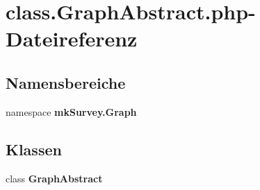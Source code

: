 \section{class.GraphAbstract.php-Dateireferenz}
\label{class_8GraphAbstract_8php}
\subsection*{Namensbereiche}
\begin{CompactItemize}
\item 
namespace {\bf mkSurvey.Graph}
\end{CompactItemize}
\subsection*{Klassen}
\begin{CompactItemize}
\item 
class {\bf GraphAbstract}
\end{CompactItemize}
